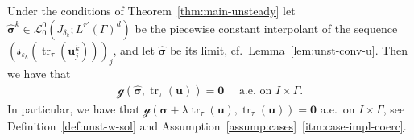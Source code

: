 \documentclass[reqno,a4paper]{amsart}
\def\vec#1{\boldsymbol{#1}}
\def\tr{\mathop{\mathrm{tr}}\nolimits}
\def\b0{\vec{0}}
\def\bu{\vec{u}}
\def\bsigma{\vec{\sigma}}
\def\gbd{\vec{\mathcal{g}}}
\begin{document}
	\begin{lemma}
		\label{lem:unst-conv-s-c2-v}
		Under the conditions of Theorem~\ref{thm:main-unsteady} let $\widehat{\bsigma}^k  \in \mathcal{L}^0_0(J_{\delta_k}; L^{r'}(\Gamma)^d) $ 
		be the piecewise constant interpolant of the sequence $(\mathbf{\mathcal{s}}_{\varepsilon_k}(\tr_\tau(\bu^k_j)))_j$, and let $\widehat{\bsigma}$ be its limit, cf.~Lemma~\ref{lem:unst-conv-u}. 
		Then we have that 
		\begin{align*}
			\gbd(\widehat{\bsigma},\tr_{\tau}(\bu)) = \b0 \quad \text{ a.e. on } I \times \Gamma. 
		\end{align*}
		In particular, we have that $\gbd(\bsigma + \lambda \tr_{\tau}(\bu),\tr_{\tau}(\bu)) = \b0$ a.e.~on $I \times \Gamma$, see Definition~\ref{def:unst-w-sol} and Assumption~\ref{assump:cases}~\ref{itm:case-impl-coerc}. 
	\end{lemma}
\end{document}
